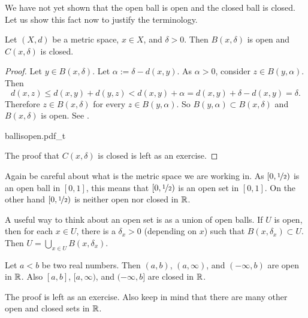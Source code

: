 We have not yet shown that the open ball is open and the closed ball is
closed.  Let us show this fact now to justify the terminology.

\begin{prop} \label{prop:topology:ballsopenclosed}
Let $(X,d)$ be a metric space, $x \in X$, and $\delta > 0$.  Then
$B(x,\delta)$ is open and 
$C(x,\delta)$ is closed.
\end{prop}

\begin{proof}
Let $y \in B(x,\delta)$.  Let $\alpha := \delta-d(x,y)$.  As $\alpha
> 0$, consider $z \in B(y,\alpha)$.  Then
\begin{equation*}
d(x,z) \leq d(x,y) + d(y,z) < d(x,y) + \alpha = d(x,y) + \delta-d(x,y) =
\delta .
\end{equation*}
Therefore $z \in B(x,\delta)$ for every $z \in B(y,\alpha)$.  So $B(y,\alpha) \subset B(x,\delta)$ and
$B(x,\delta)$ is open.  See .

\begin{myfigureht}
{ballisopen.pdf_t}
\caption{Proof that $B(x,\delta)$ is open: $B(y,\alpha) \subset
B(x,\delta)$ with the triangle inequality illustrated.\label{fig:ballisopen}}
\end{myfigureht}

The proof that $C(x,\delta)$ is closed is left as an exercise.
\end{proof}

Again be careful about what is the metric space we are working in.
As $[0,\nicefrac{1}{2})$ is
an open ball in $[0,1]$, this means that $[0,\nicefrac{1}{2})$ is
an open set in $[0,1]$.  On the other hand $[0,\nicefrac{1}{2})$
is neither open nor closed in ${\mathbb{R}}$.

A useful way to think about an open set is as a union of open balls.  If $U$ is
open, then for each $x \in U$, there is a $\delta_x > 0$ (depending on $x$) such that
$B(x,\delta_x) \subset U$.  Then $U = \bigcup_{x\in U} B(x,\delta_x)$.

\begin{prop} \label{prop:topology:intervals:openclosed}
Let $a < b$ be two real numbers.  Then $(a,b)$, $(a,\infty)$,
and $(-\infty,b)$ are open in ${\mathbb{R}}$.
Also $[a,b]$, $[a,\infty)$,
and $(-\infty,b]$ are closed in ${\mathbb{R}}$.
\end{prop}

The proof is left as an exercise.  Also keep in mind that
there are many other open and
closed sets in ${\mathbb{R}}$.


